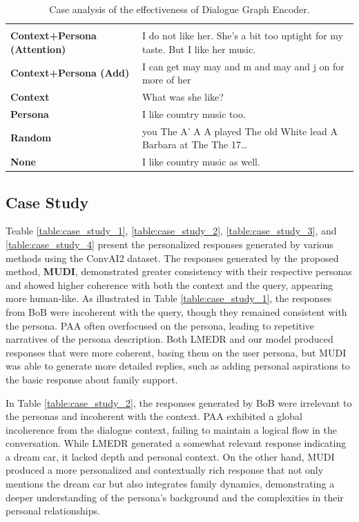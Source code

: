 \documentclass[letterpaper]{article} %
\begin{document}
\begin{table}[ht]
\begin{tabular}{|p{3.5cm}|p{12cm}|}
\hhline{|==|}
\rowcolor[RGB]{204,217,245}
\multicolumn{2}{|c|}{\textbf{Response}} \\
\hhline{|==|}
\textbf{Context+Persona (Attention)} & I do not like her. She's a bit too uptight for my taste. But I like her music. \\
\textbf{Context+Persona (Add)} & I can get may may and m and may and j on for more of her \\
\textbf{Context} &  What was she like? \\
\textbf{Persona} & I like country music too. \\
\textbf{Random} & you The A’ A A played The old White lead A Barbara at The The 17… \\
\textbf{None} & I like country music as well. \\

\hline
\end{tabular}
\caption{Case analysis of the effectiveness of Dialogue Graph Encoder.}
\label{table:case_study_effectiveness_of_dialogue_graph_encoder}
\end{table}

\subsection{Case Study}
Teable \ref{table:case_study_1}, \ref{table:case_study_2}, \ref{table:case_study_3}, and \ref{table:case_study_4} present the personalized responses generated by various methods using the ConvAI2 dataset. The responses generated by the proposed method, \textbf{MUDI}, demonstrated greater consistency with their respective personas and showed higher coherence with both the context and the query, appearing more human-like. As illustrated in Table \ref{table:case_study_1}, the responses from BoB were incoherent with the query, though they remained consistent with the persona. PAA often overfocused on the persona, leading to repetitive narratives of the persona description. Both LMEDR and our model produced responses that were more coherent, basing them on the user persona, but MUDI was able to generate more detailed replies, such as adding personal aspirations to the basic response about family support. 

In Table \ref{table:case_study_2}, the responses generated by BoB were irrelevant to the personas and incoherent with the context. PAA exhibited a global incoherence from the dialogue context, failing to maintain a logical flow in the conversation. While LMEDR generated a somewhat relevant response indicating a dream car, it lacked depth and personal context. On the other hand, MUDI produced a more personalized and contextually rich response that not only mentions the dream car but also integrates family dynamics, demonstrating a deeper understanding of the persona's background and the complexities in their personal relationships. 
\end{document}
